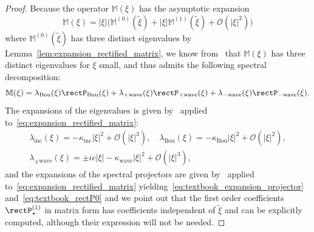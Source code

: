 \documentclass[AHL,Unicode,longabstracts,published]{cedram}
\newcommand{\Wave}{\mathrm{wave}}
\newcommand{\Inc}{\mathrm{inc}}
\newcommand{\Bou}{\mathrm{Bou}}
\newcommand{\rectsL}{\mathbb{M}}
\newcommand{\OO}{\mathcal{O}}
\begin{document}
\begin{proof}
Because the operator $\rectsL(\xi)$ has the asymptotic expansion
\[
\rectsL(\xi) = |\xi| \Big(\rectsL^{(0)}\left(\widetilde{\xi} \right) + | \xi | \rectsL^{(1)}\left(\widetilde{\xi} \right) + \OO\left(|\xi|^2 \right) \Big)
\]
where $\rectsL^{(0)}\left(\widetilde{\xi} \right)$ has three distinct eigenvalues by Lemma~\ref{lem:expansion_rectified_matrix}, we know from~\cite[Chapter~2, Theorem~5.4]{K1995} that $\rectsL(\xi)$ has three distinct eigenvalues for $\xi$ small, and thus admits the following spectral decomposition:
\[
\rectsL(\xi) = \lambda_\Bou(\xi) \rectP_\Bou(\xi) + \lambda_{+ \Wave}(\xi) \rectP_{+\Wave}(\xi) + \lambda_{- \Wave}(\xi) \rectP_{-\Wave}(\xi).
\]
The expansions of the eigenvalues is given by~\cite[Chapter~II-(5.12)]{K1995} applied to~\eqref{eq:expansion_rectified_matrix}:
\begin{gather*}
\lambda_\Inc(\xi) = - \kappa_\Inc | \xi |^2 + \OO\left(|\xi|^3 \right), \quad \lambda_\Bou(\xi) = - \kappa_\Bou | \xi |^2 + \OO\left(| \xi |^2 \right),\\
\lambda_{\pm \Wave}(\xi) = \pm i c | \xi| - \kappa_{\Wave} | \xi |^2 + \OO \left(| \xi |^3 \right),
\end{gather*}
and the expansions of the spectral projectors are given by~\cite[Chapter~II-(5.9)]{K1995} applied to~\eqref{eq:expansion_rectified_matrix} yielding~\eqref{eq:textbook_expansion_projector} and~\eqref{eq:textbook_rectP0} and we point out that the first order coefficients $\rectP^{(1)}_{\star}$ in matrix form has coefficients independent of $\widetilde{\xi}$ and can be explicitly computed, although their expression will not be needed.
\end{proof}
\end{document}
